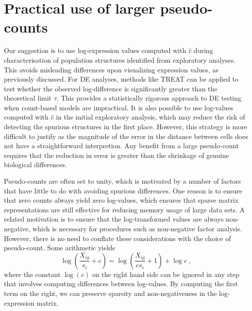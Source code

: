 \documentclass[10pt,letterpaper]{article}
\begin{document}

\section{Practical use of larger pseudo-counts}
Our suggestion is to use log-expression values computed with $\hat c$ during characterisation of population structures identified from exploratory analyses.
This avoids misleading differences upon visualizing expression values, as previously discussed.
For DE analyses, methods like TREAT \cite{mccarthy2009testing} can be applied to test whether the observed log-difference is significantly greater than the theoretical limit $\tau$.
This provides a statistically rigorous approach to DE testing when count-based models are impractical.
It is also possible to use log-values computed with $\hat c$ in the initial exploratory analysis, which may reduce the risk of detecting the spurious structures in the first place.
However, this strategy is more difficult to justify as the magnitude of the error in the distance between cells does not have a straightforward interpretion.
Any benefit from a large pseudo-count requires that the reduction in error is greater than the shrinkage of genuine biological differences.

Pseudo-counts are often set to unity, which is motivated by a number of factors that have little to do with avoiding spurious differences.
One reason is to ensure that zero counts always yield zero log-values, which ensures that sparse matrix representations are still effective for reducing memory usage of large data sets.
A related motivation is to ensure that the log-transformed values are always non-negative, which is necessary for procedures such as non-negative factor analysis.
However, there is no need to conflate these considerations with the choice of pseudo-count.
Some arithmetic yields 
\[
 \log\left(\frac{X_{ig}}{s_i}+ c\right) = \log\left(\frac{X_{ig}}{cs_i}+ 1\right) + \log c \;,
\]
where the constant $\log(c)$ on the right hand side can be ignored in any step that involves computing differences between log-values.
By computing the first term on the right, we can preserve sparsity and non-negativeness in the log-expression matrix.
\end{document}
